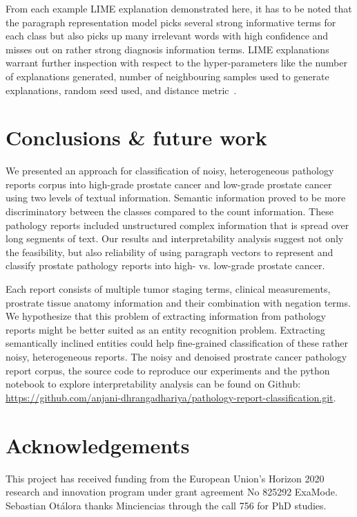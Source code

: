 \documentclass[runningheads]{llncs}
\begin{document}
From each example LIME explanation demonstrated here, it has to be noted that the paragraph representation model picks several strong informative terms for each class but also picks up many irrelevant words with high confidence and misses out on rather strong diagnosis information terms.
LIME explanations warrant further inspection with respect to the hyper-parameters like the number of explanations generated, number of neighbouring samples used to generate explanations, random seed used, and distance metric~\cite{madhyastha2019model}.
%
\section{Conclusions \& future work}
\label{sec:conc}
We presented an approach for classification of noisy, heterogeneous pathology reports corpus into high-grade prostate cancer and low-grade prostate cancer using two levels of textual information. 
Semantic information proved to be more discriminatory between the classes compared to the count information.
These pathology reports included unstructured complex information that is spread over long segments of text. 
Our results and interpretability analysis suggest not only the feasibility, but also reliability of using paragraph vectors to represent and classify prostate pathology reports into high- vs. low-grade prostate cancer.


Each report consists of multiple tumor staging terms, clinical measurements, prostrate tissue anatomy information and their combination with negation terms.
We hypothesize that this problem of extracting information from pathology reports might be better suited as an entity recognition problem. Extracting semantically inclined entities could help fine-grained classification of these rather noisy, heterogeneous reports. 
The noisy and denoised prostrate cancer pathology report corpus, the source code to reproduce our experiments and the python notebook to explore interpretability analysis can be found on Github: \url{https://github.com/anjani-dhrangadhariya/pathology-report-classification.git}.  %
%
%
%
\section{Acknowledgements}
This project has received funding from the European Union's Horizon 2020 research and innovation program under grant agreement No 825292 ExaMode.  Sebastian Ot\'{a}lora thanks Minciencias through the call 756 for PhD studies.


\end{document}
